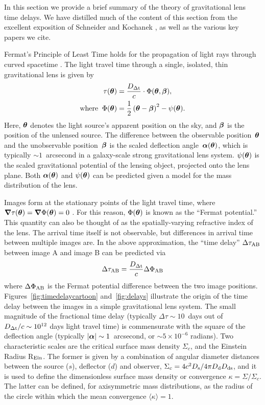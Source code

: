 
In this section we provide a brief summary of the theory of
gravitational lens time delays. We have distilled much of the content
of this section from the excellent exposition of Schneider and
Kochanek \citep{SKW06}, as well as the various key papers we cite.


Fermat's Principle of Least Time holds for the propagation of light rays
through curved spacetime \citep{Per90a,Per90b}. The light travel time through a single, isolated, thin
gravitational lens is given by
%
\begin{align}
    \tau(\boldsymbol{\theta}) &= \frac{D_{\Delta{\rm t}}}{c} \cdot \Phi(\boldsymbol{\theta},\boldsymbol{\beta}), \\
    \text{where\;\;} \Phi(\boldsymbol{\theta}) &= \frac{1}{2}\left(\boldsymbol{\theta} - \boldsymbol{\beta}\right)^2 - \psi(\boldsymbol{\theta}).
\end{align}
%
Here, $\boldsymbol{\theta}$ denotes the light source's apparent position on the sky, and
$\boldsymbol{\beta}$ is the position of the unlensed source. The difference between the
observable position~$\boldsymbol{\theta}$ and the unobservable position~$\boldsymbol{\beta}$ is the
scaled deflection angle~$\boldsymbol{\alpha}({\boldsymbol{\theta}})$, which is typically
$\sim1$~arcsecond in a galaxy-scale strong gravitational lens system.
$\psi(\boldsymbol{\theta})$ is the scaled gravitational potential of the lensing object,
projected onto the lens plane. Both $\boldsymbol{\alpha}(\boldsymbol{\theta})$ and $\psi(\boldsymbol{\theta})$ can be
predicted given a model for the mass distribution of the lens.

Images form at the stationary points of the light travel time, where $\boldsymbol{\nabla}
\tau(\boldsymbol{\theta}) = \boldsymbol{\nabla} \Phi(\boldsymbol{\theta}) = 0$ \citep{Schneider1985}. For this reason,
$\Phi(\boldsymbol{\theta})$ is known as the ``Fermat potential.'' This quantity can also
be thought of as the spatially-varying refractive index of the lens. The
arrival time itself is not observable, but differences in arrival time
between multiple images are. In the above approximation, the  ``time delay'' $\Delta \tau_{\rm AB}$
between image A and
image B can be predicted via
%
\begin{equation}
    \Delta \tau_{\rm AB} = \frac{D_{\Delta{\rm t}}}{c} \Delta \Phi_{\rm AB} \label{eq:timedelay}
\end{equation}
%
where $\Delta \Phi_{\rm AB}$ is the Fermat potential difference
between the two image positions.  Figures~\ref{fig:timedelaycartoon}
and~\ref{fig:delays} illustrate the origin of the time delay between
the images in a simple gravitational lens system. The small magnitude
of the fractional time delay (typically $\Delta\tau \sim 10$~days out
of $D_{\Delta{\rm t}}/c \sim 10^{12}$ days light travel time) is commensurate with
the square of the deflection angle (typically
$|\boldsymbol{\alpha}|\sim1$~arcsecond, or $\sim 5\times10^{-6}$
radians). Two characteristic scales are the critical surface mass
density $\Sigma_c$, and the Einstein Radius R$_{\rm Ein}$. The former
is given by a combination of angular diameter distances between the
source ($s$), deflector ($d$) and observer, $\Sigma_c=4c^2D_{\rm s}/4\pi
D_{\rm d}D_{\rm ds}$, and it is used to define the dimensionless surface mass
density or convergence $\kappa=\Sigma/\Sigma_c$. The latter can be
defined, for axisymmetric mass distributions, as the radius of the
circle within which the mean convergence $\langle \kappa \rangle=1$.


